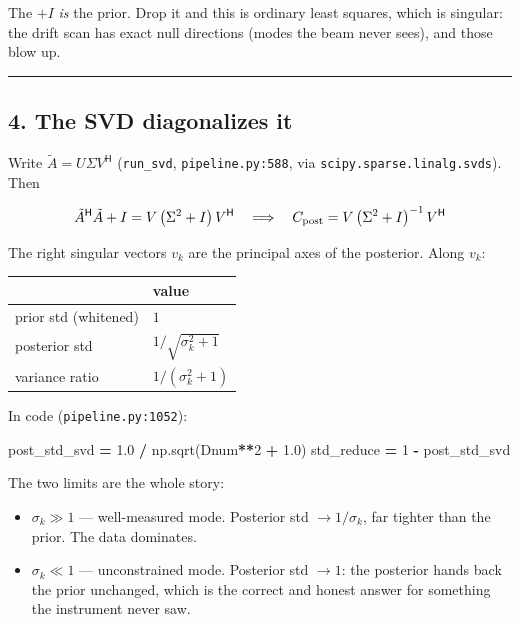 \documentclass[
  11pt,
]{article}
\newenvironment{Shaded}{\begin{snugshade}}{\end{snugshade}}
\newcommand{\DecValTok}[1]{\textcolor[rgb]{0.00,0.00,0.81}{#1}}
\newcommand{\FloatTok}[1]{\textcolor[rgb]{0.00,0.00,0.81}{#1}}
\newcommand{\NormalTok}[1]{#1}
\newcommand{\OperatorTok}[1]{\textcolor[rgb]{0.81,0.36,0.00}{\textbf{#1}}}
\providecommand{\tightlist}{%
  \setlength{\itemsep}{0pt}\setlength{\parskip}{0pt}}
\begin{document}
The \(+I\) \emph{is} the prior. Drop it and this is ordinary least
squares, which is singular: the drift scan has exact null directions
(modes the beam never sees), and those blow up.

\begin{center}\rule{0.5\linewidth}{0.5pt}\end{center}

\hypertarget{4-the-svd-diagonalizes-it}{%
\subsection{4. The SVD diagonalizes
it}\label{4-the-svd-diagonalizes-it}}

Write \(\tilde{A} = U \Sigma V^{\mathsf H}\) (\texttt{run\_svd},
\texttt{pipeline.py:588}, via \texttt{scipy.sparse.linalg.svds}). Then

\[ \tilde{A}^{\mathsf H}\tilde{A} + I = V\left(\Sigma^2 + I\right)V^{\mathsf H} \quad\Longrightarrow\quad C_{\rm post} = V\left(\Sigma^2 + I\right)^{-1}V^{\mathsf H} \]

The right singular vectors \(v_k\) are the principal axes of the
posterior. Along \(v_k\):

\begin{longtable}[]{@{}ll@{}}
\toprule\noalign{}
& value \\
\midrule\noalign{}
\endhead
\bottomrule\noalign{}
\endlastfoot
prior std (whitened) & \(1\) \\
posterior std & \(1/\sqrt{\sigma_k^2 + 1}\) \\
variance ratio & \(1/(\sigma_k^2 + 1)\) \\
\end{longtable}

In code (\texttt{pipeline.py:1052}):

\begin{Shaded}
\begin{Highlighting}[]
\NormalTok{post\_std\_svd }\OperatorTok{=} \FloatTok{1.0} \OperatorTok{/}\NormalTok{ np.sqrt(Dnum}\OperatorTok{**}\DecValTok{2} \OperatorTok{+} \FloatTok{1.0}\NormalTok{)}
\NormalTok{std\_reduce }\OperatorTok{=} \DecValTok{1} \OperatorTok{{-}}\NormalTok{ post\_std\_svd}
\end{Highlighting}
\end{Shaded}

The two limits are the whole story:

\begin{itemize}
\tightlist
\item
  \(\sigma_k \gg 1\) --- well-measured mode. Posterior std
  \(\to 1/\sigma_k\), far tighter than the prior. The data dominates.
\item
  \(\sigma_k \ll 1\) --- unconstrained mode. Posterior std \(\to 1\):
  the posterior hands back the prior unchanged, which is the correct and
  honest answer for something the instrument never saw.
\end{itemize}
\end{document}
